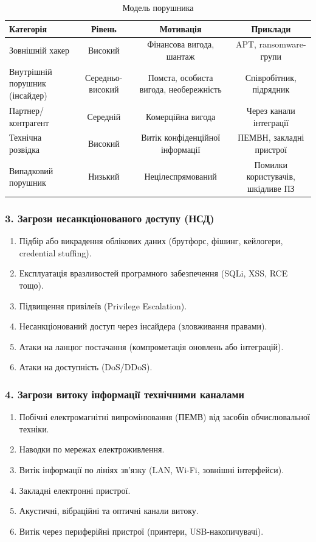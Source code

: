 \documentclass{article}
\begin{document}
\begin{table}[h!]
\hspace*{-4cm}
\centering
\small
\begin{tabular}{lccc}
\hline
\textbf{Категорія}              & \textbf{Рівень} & \textbf{Мотивація} & \textbf{Приклади} \\
\hline
Зовнішній хакер                 & Високий          & Фінансова вигода, шантаж & APT, ransomware-групи \\
Внутрішній порушник (інсайдер)  & Середньо-високий & Помста, особиста вигода, необережність & Співробітник, підрядник \\
Партнер/контрагент              & Середній         & Комерційна вигода & Через канали інтеграції \\
Технічна розвідка               & Високий          & Витік конфіденційної інформації & ПЕМВН, закладні пристрої \\
Випадковий порушник             & Низький          & Нецілеспрямований & Помилки користувачів, шкідливе ПЗ \\
\hline
\end{tabular}
\caption{Модель порушника}
\label{tab:threat-model}
\end{table}

\subsubsection{3. Загрози несанкціонованого доступу (НСД)}
\begin{enumerate}
    \item Підбір або викрадення облікових даних (брутфорс, фішинг, кейлогери, credential stuffing).
    \item Експлуатація вразливостей програмного забезпечення (SQLi, XSS, RCE тощо).
    \item Підвищення привілеїв (Privilege Escalation).
    \item Несанкціонований доступ через інсайдера (зловживання правами).
    \item Атаки на ланцюг постачання (компрометація оновлень або інтеграцій).
    \item Атаки на доступність (DoS/DDoS).
\end{enumerate}

\subsubsection{4. Загрози витоку інформації технічними каналами}
\begin{enumerate}
    \item Побічні електромагнітні випромінювання (ПЕМВ) від засобів обчислювальної техніки.
    \item Наводки по мережах електроживлення.
    \item Витік інформації по лініях зв'язку (LAN, Wi-Fi, зовнішні інтерфейси).
    \item Закладні електронні пристрої.
    \item Акустичні, вібраційні та оптичні канали витоку.
    \item Витік через периферійні пристрої (принтери, USB-накопичувачі).
\end{enumerate}
\end{document}

